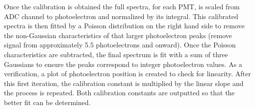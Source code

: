 \documentclass[12pt,letterpaper]{article}
\begin{document}
Once the calibration is obtained the full spectra, for each PMT, is scaled from ADC channel to photoelectron and normalized by its integral. This calibrated spectra is then fitted by a Poisson distribution on the right hand side to remove the non-Gaussian characteristics of that larger photoelectron peaks (remove signal from approximately 5.5 photoelectrons and onward). Once the Poisson characteristics are subtracted, the final spectrum is fit with a sum of three Gaussians to ensure the peaks correspond to integer photoelectron values. As a verification, a plot of photoelectron position is created to check for linearity. After this first iteration, the calibration constant is multiplied by the linear slope and the process is repeated. Both calibration constants are outputted so that the better fit can be determined.
\end{document}
